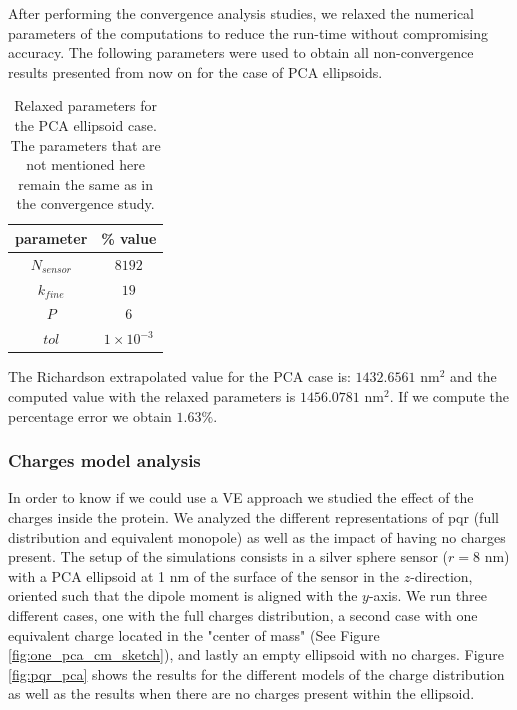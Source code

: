 After performing the convergence analysis studies, we relaxed the numerical parameters of the computations to reduce the run-time without 
compromising accuracy. The following parameters were used to obtain all non-convergence results presented from now on for the case of PCA ellipsoids.

\begin{table}%
    \centering
    \caption{\label{table:rel_pca_par} Relaxed parameters for the PCA ellipsoid case. The parameters that are not 
    mentioned here remain the same as in the convergence study.} 
    \begin{tabular}{c c}
    \hline%
    parameter & \% value \\
    \hline%
     $N_{sensor}$ & $8192$ \\
     $k_{fine}$ & $19$ \\
     $P$ & $6$ \\
     $tol$ & $1\times 10^{-3}$ \\
    \hline%
    \end{tabular}
\end{table}

The Richardson extrapolated value for the PCA case is: $1432.6561$ nm$^2$ and the computed value with the relaxed parameters 
is $1456.0781$ nm$^2$. If we compute the percentage error we obtain $1.63 \%$.

\subsubsection{Charges model analysis} \label{ssub:pqr_analysis}

In order to know if we could use a VE approach we studied the effect of the charges inside the protein. We analyzed
the different representations of pqr (full distribution and equivalent monopole) as well as the impact of having
no charges present. The setup of the simulations consists in a silver sphere sensor ($r=8$ nm) with a PCA ellipsoid 
at 1 nm of the surface of the sensor in the $z$-direction, oriented such that the dipole moment is aligned with the $y$-axis. We run 
three different cases, one with the full charges distribution, a second case with one equivalent charge located in the
"center of mass" (See Figure \ref{fig:one_pca_cm_sketch}), and lastly an empty ellipsoid with no charges. Figure 
\ref{fig:pqr_pca} shows the results for the different models of the charge distribution as well as the results when 
there are no charges present within the ellipsoid. 

